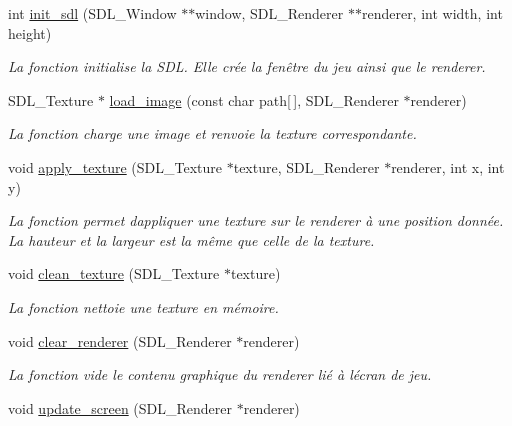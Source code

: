\begin{DoxyCompactItemize}
\item 
int \hyperlink{sdl2-light_8c_a7307299b4ef47feaa1a4e95341a04c7a}{init\+\_\+sdl} (S\+D\+L\+\_\+\+Window $\ast$$\ast$window, S\+D\+L\+\_\+\+Renderer $\ast$$\ast$renderer, int width, int height)
\begin{DoxyCompactList}\small\item\em La fonction initialise la S\+DL. Elle crée la fenêtre du jeu ainsi que le renderer. \end{DoxyCompactList}\item 
S\+D\+L\+\_\+\+Texture $\ast$ \hyperlink{sdl2-light_8c_a85a3dc2aec2bf7ee942b5761ed9e4b35}{load\+\_\+image} (const char path\mbox{[}$\,$\mbox{]}, S\+D\+L\+\_\+\+Renderer $\ast$renderer)
\begin{DoxyCompactList}\small\item\em La fonction charge une image et renvoie la texture correspondante. \end{DoxyCompactList}\item 
void \hyperlink{sdl2-light_8c_aa94de38ff23c16e13439cbe9cea15256}{apply\+\_\+texture} (S\+D\+L\+\_\+\+Texture $\ast$texture, S\+D\+L\+\_\+\+Renderer $\ast$renderer, int x, int y)
\begin{DoxyCompactList}\small\item\em La fonction permet d\textquotesingle{}appliquer une texture sur le renderer à une position donnée. La hauteur et la largeur est la même que celle de la texture. \end{DoxyCompactList}\item 
void \hyperlink{sdl2-light_8c_a6be5ef20bb308cf4f73ab911b33705e8}{clean\+\_\+texture} (S\+D\+L\+\_\+\+Texture $\ast$texture)
\begin{DoxyCompactList}\small\item\em La fonction nettoie une texture en mémoire. \end{DoxyCompactList}\item 
void \hyperlink{sdl2-light_8c_a572bf07064fc55f12238e71ba2930f5f}{clear\+\_\+renderer} (S\+D\+L\+\_\+\+Renderer $\ast$renderer)
\begin{DoxyCompactList}\small\item\em La fonction vide le contenu graphique du renderer lié à l\textquotesingle{}écran de jeu. \end{DoxyCompactList}\item 
void \hyperlink{sdl2-light_8c_adaf353d9ae01b52dd37cd0adf2d5c9ee}{update\+\_\+screen} (S\+D\+L\+\_\+\+Renderer $\ast$renderer)

\end{DoxyCompactItemize}
